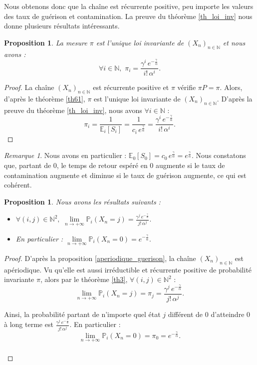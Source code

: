 \documentclass[12pt,a4paper]{report}
\newtheorem{prop}[thm]{Proposition}
\theoremstyle{remark}
\newtheorem*{remark}{Remarque}
\begin{document}
Nous obtenons donc que la chaîne est récurrente positive, peu importe les valeurs des taux de guérison et contamination. La preuve du théorème \ref{th_loi_inv} nous donne plusieurs résultats intéressants.

\begin{prop}
La mesure $\pi$ est l'unique loi invariante de $(X_n)_{n \in \mathbb{N}}$ et nous avons : $$\forall i \in \mathbb{N}, \, \, \pi_i = \frac{\gamma^i \, e^{-\frac{\gamma}{\alpha}}}{i! \, \alpha^i}.$$
\end{prop}
\begin{proof}
La chaîne $(X_n)_{n \in \mathbb{N}}$ est récurrente positive et $\pi$ vérifie $\pi P = \pi$. Alors, d'après le théorème \ref{th61}, $\pi$ est l'unique loi invariante de $(X_n)_{n \in \mathbb{N}}$. D'après la preuve du théorème \ref{th_loi_inv}, nous avons $\forall i \in \mathbb{N}$ :
$$\pi_i = \frac{1}{\mathbb{E}_i[S_i]} = \frac{1}{c_i \, e^{\frac{\gamma}{\alpha}}} = \frac{\gamma^i \, e^{-\frac{\gamma}{\alpha}}}{i! \, \alpha^i}.$$
\end{proof}
\begin{remark}
Nous avons en particulier : $\mathbb{E}_0[S_0] = c_0 \, e^{\frac{\gamma}{\alpha}} = e^{\frac{\gamma}{\alpha}}.$ Nous constatons que, partant de $0$, le temps de retour espéré en $0$ augmente si le taux de contamination augmente  et diminue si le taux de guérison augmente, ce qui est cohérent.
\end{remark}
\begin{prop}
Nous avons les résultats suivants :
\begin{itemize}
    \item $\forall (i,j) \in \mathbb{N}^2, \, \, \lim\limits_{n \to +\infty} \mathbb{P}_i(X_n = j) = \frac{\gamma^j \, e^{-\frac{\gamma}{\alpha}}}{j! \, \alpha^j}.$
    \item En particulier : $\lim\limits_{n \to +\infty} \mathbb{P}_i(X_n = 0) = e^{-\frac{\gamma}{\alpha}}.$
\end{itemize}
\end{prop}
\begin{proof}
D'après la proposition \ref{aperiodique_guerison}, la chaîne $(X_n)_{n \in \mathbb{N}}$ est apériodique. Vu qu'elle est aussi irréductible et récurrente positive de probabilité invariante $\pi$, alors par le théorème \ref{th3}, $\forall (i,j) \in \mathbb{N}^2$ :
$$\lim\limits_{n \to +\infty} \mathbb{P}_i(X_n = j) = \pi_j = \frac{\gamma^j \, e^{-\frac{\gamma}{\alpha}}}{j! \, \alpha^j}.$$

Ainsi, la probabilité partant de n’importe quel état $j$ différent de $0$ d’atteindre $0$ à long terme est $\frac{\gamma^j \, e^{-\frac{\gamma}{\alpha}}}{j! \, \alpha^j}$. En particulier :
$$\lim\limits_{n \to +\infty} \mathbb{P}_i(X_n = 0) = \pi_0 = e^{-\frac{\gamma}{\alpha}}.$$\\
\end{proof}
\end{document}
